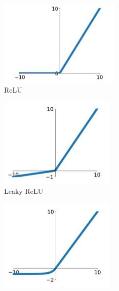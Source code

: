 \begin{figure}[H]
\begin{subfigure}{.5\textwidth}
  \centering
  \includegraphics[width=.8\linewidth]{figs/Relu.png}
  \caption{ReLU}
  \label{fig:Relu}
\end{subfigure}%
\begin{subfigure}{.5\textwidth}
  \centering
  \includegraphics[width=.8\linewidth]{figs/leakyRelu.png}
  \caption{Leaky ReLU}
  \label{fig:LeakyRelu}
\end{subfigure}
\begin{subfigure}{.5\textwidth}
  \centering
  \includegraphics[width=.8\linewidth]{figs/Elu.png}

\end{subfigure}
\end{figure}
